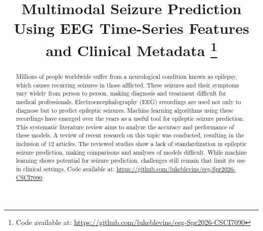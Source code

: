 \documentclass[conference]{IEEEtran}
\begin{document}
\title{
Multimodal Seizure Prediction Using EEG Time-Series Features and Clinical Metadata
\thanks{Code available at: \url{https://github.com/lukeblevins/eeg-Spr2026-CSCI7090}}
}

\author{
\and
{}
\and
{}
}

\maketitle


\begin{abstract}
Millions of people worldwide suffer from a neurological condition known as epilepsy, which causes recurring seizures in those afflicted. These seizures and their symptoms vary widely from person to person, making diagnosis and treatment difficult for medical professionals. Electroencephalography (EEG) recordings are used not only to diagnose but to predict epileptic seizures. Machine learning algorithms using these recordings have emerged over the years as a useful tool for epileptic seizure prediction. This systematic literature review aims to analyze the accuracy and performance of these models. A review of recent research on this topic was conducted, resulting in the inclusion of 12 articles. The reviewed studies show a lack of standardization in epileptic seizure prediction, making comparisons and analyses of models difficult. While machine learning shows potential for seizure prediction, challenges still remain that limit its use in clinical settings. Code available at: \url{https://github.com/lukeblevins/eeg-Spr2026-CSCI7090}
\end{abstract}
\end{document}
